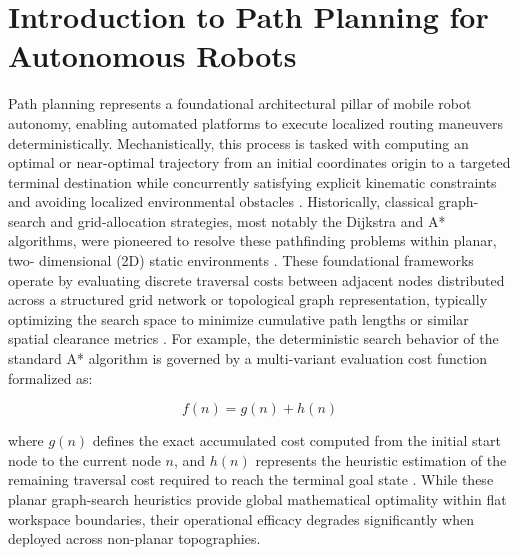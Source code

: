 \section{Introduction to Path Planning for Autonomous Robots}

Path planning represents a foundational architectural pillar of mobile robot
autonomy, enabling automated platforms to execute localized routing maneuvers
deterministically. Mechanistically, this process is tasked with computing an
optimal or near-optimal trajectory from an initial coordinates origin to a
targeted terminal destination while concurrently satisfying explicit kinematic
constraints and avoiding localized environmental obstacles
\citep{SanchezIbanez_2021_pathplanning}. Historically, classical graph-search
and grid-allocation strategies, most notably the Dijkstra and A* algorithms,
were pioneered to resolve these pathfinding problems within planar, two-
dimensional (2D) static environments \citep{Karur_2021_surveypath,
Noto_2000_methodshortest}. These foundational frameworks operate by evaluating
discrete traversal costs between adjacent nodes distributed across a structured
grid network or topological graph representation, typically optimizing the
search space to minimize cumulative path lengths or similar spatial clearance
metrics \citep{Karur_2021_surveypath, Noto_2000_methodshortest}. For example,
the deterministic search behavior of the standard A* algorithm is governed by a
multi-variant evaluation cost function formalized as:

\begin{equation}
    f(n) = g(n) + h(n)
\end{equation}

\noindent where $g(n)$ defines the exact accumulated cost computed from the initial start node to
the current node $n$, and $h(n)$ represents the heuristic estimation of the remaining traversal cost
required to reach the terminal goal state \citep{Karur_2021_surveypath, Noto_2000_methodshortest}. While these planar graph-search
heuristics provide global mathematical optimality within flat workspace boundaries, their
operational efficacy degrades significantly when deployed across non-planar topographies.

